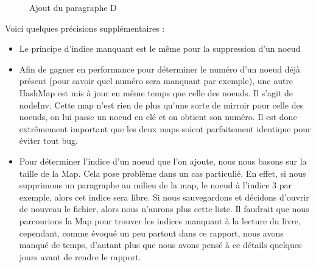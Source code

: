 			\begin{figure}[H]
				\begin{center}
				\end{center}
				\caption{Ajout du paragraphe D}
			\end{figure}

			Voici quelques précisions supplémentaires :

			\begin{itemize}
				\item{Le principe d'indice manquant est le même pour la suppression d'un noeud}
				\item{Afin de gagner en performance pour déterminer le numéro d'un noeud déjà présent (pour savoir quel numéro sera manquant par exemple), une autre HashMap est mis à jour en même temps que celle des noeuds. Il s'agit de nodeInv. Cette map n'est rien de plus qu'une sorte de mirroir pour celle des noeuds, on lui passe un noeud en clé et on obtient son numéro. Il est donc extrêmement important que les deux maps soient parfaitement identique pour éviter tout bug.}
				\item{\label{subsec:noeud_delete_missing_index}Pour déterminer l'indice d'un noeud que l'on ajoute, nous nous basons sur la taille de la Map. Cela pose problème dans un cas particulié. En effet, si nous supprimons un paragraphe au milieu de la map, le noeud à l'indice 3 par exemple, alors cet indice sera libre. Si nous sauvegardons et décidons d'ouvrir de nouveau le fichier, alors nous n'aurons plus cette liste. Il faudrait que nous parcourions la Map pour trouver les indices manquant à la lecture du livre, cependant, comme évoqué un peu partout dans ce rapport, nous avons manqué de temps, d'autant plus que nous avons pensé à ce détails quelques jours avant de rendre le rapport.}
			\end{itemize}

